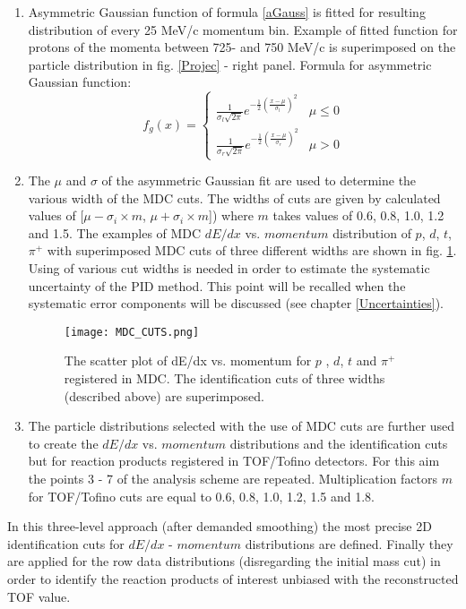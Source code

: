 \begin{enumerate}
   \item Asymmetric Gaussian function of formula \ref{aGauss} is fitted for resulting distribution of every 25 MeV/c momentum bin. Example of fitted function 
   for protons of the momenta between 725- and 750 MeV/c is superimposed on the particle distribution in fig. \ref{Projec} - right panel. 
   Formula for asymmetric Gaussian function:
    \begin{equation}
   	f_g(x)=\begin{cases}
   		\frac{1}{\sigma_l\sqrt{2\pi}}e^{-\frac{1}{2}\left(\frac{x-\mu}{\sigma_l}\right)^2}&\mu\le0\\
   		\frac{1}{\sigma_r\sqrt{2\pi}}e^{-\frac{1}{2}\left(\frac{x-\mu}{\sigma_r}\right)^2}&\mu>0
   	\end{cases}
   \label{aGauss}
   \end{equation}
   \item The $\mu$ and $\sigma$ of the asymmetric Gaussian fit are used to determine the various width of the MDC cuts. 
   The widths of cuts are given by calculated values of [$\mu - \sigma_i \times m$, $\mu + \sigma_i \times m$]) 
   where $m$ takes values of 0.6, 0.8, 1.0, 1.2 and 1.5. The examples of MDC $dE/dx$ vs. $momentum$ distribution of $p$, $d$, $t$, $\pi^+$
   with superimposed MDC cuts of three different widths are shown in fig. \ref{MDCcut}. 
   Using of various cut widths is needed in order to estimate the systematic uncertainty of the PID method. This point will be recalled when
   the systematic error components will be discussed (see chapter \ref{Uncertainties}).
   \begin{figure}
   	\centering
   	\texttt{[image: MDC\_CUTS.png]}
   	\caption{The scatter plot of dE/dx vs. momentum for $p$ , $d$, $t$ and $\pi^+$ registered in MDC. The identification cuts of three widths 
   	(described above) are superimposed. 
    }
   	\label{MDCcut}
   \end{figure}
  \item The particle distributions selected with the use of MDC cuts are further used to create the $dE/dx$ vs. $momentum$ distributions 
  and the identification cuts but for reaction products registered in TOF/Tofino detectors.
  For this aim the points 3 - 7 of the analysis scheme are repeated. Multiplication factors $m$ 
  for TOF/Tofino cuts are equal to 0.6, 0.8, 1.0, 1.2, 1.5 and 1.8.
  \end{enumerate}
  
  In this three-level approach (after demanded smoothing) the most precise 2D identification cuts for $dE/dx$ - $momentum$ distributions are defined.
  Finally they are applied for the row data distributions (disregarding the initial mass cut) in order to identify the reaction products of interest
  unbiased with the reconstructed TOF value. 


